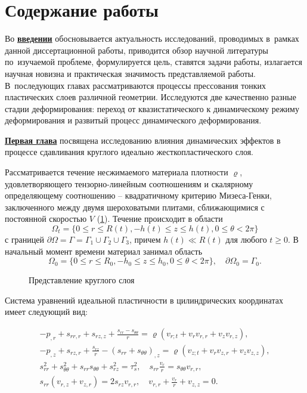 \section*{Содержание работы}
Во \underline{\textbf{введении}} обосновывается актуальность
исследований, проводимых в~рамках данной диссертационной работы,
приводится обзор научной литературы по~изучаемой проблеме,
формулируется цель, ставятся задачи работы, излагается научная новизна
и практическая значимость представляемой работы. В~последующих главах
рассматриваются процессы прессования тонких пластических слоев различной геометрии.
Исследуются две качественно разные стадии деформирования: переход от квазистатического к динамическому режиму деформирования и развитый процесс динамического деформирования.

\underline{\textbf{Первая глава}} посвящена исследованию влияния динамических эффектов в процессе сдавливания круглого идеально жесткопластического слоя.

Рассматривается течение несжимаемого материала плотности $\varrho$, удовлетворяющего тензорно-линейным соотношениям и скалярному определяющему соотношению -- квадратичному критерию Мизеса-Генки, заключенного между двумя шероховатыми плитами, сближающимися с постоянной скоростью $V$ (\cref{fig:ch1/layer}). Течение происходит в области
\begin{equation}
  \Omega_{t} = \{0 \le r \le R(t), -h(t) \le z \le h(t), 0 \le \theta < 2\pi\}
\end{equation}
с границей $\partial\Omega = \Gamma = \Gamma_{1} \cup \Gamma_{2} \cup \Gamma_{3}$, причем $h(t) \ll R(t)$ для любого $t \ge 0$. В начальный момент времени материал занимал область
\begin{equation}
  \Omega_{0} = \{0 \le r \le R_{0}, -h_{0} \le z \le h_{0}, 0 \le \theta < 2\pi\}, \quad \partial\Omega_{0} = \Gamma_{0}.
\end{equation}

\begin{figure}[ht]
  \caption{Представление круглого слоя}
  \label{fig:ch1/layer}
\end{figure}

Система уравнений идеальной пластичности в цилиндрических координатах имеет следующий вид:

\begin{gather}
  \label{eqs:ch1/general/begin}
  -p_{,r}+s_{rr,r}+s_{rz,z}+\frac{s_{rr}-s_{\theta\theta}}{r} = \varrho \left(v_{r;t}+v_{r} v_{r,r} + v_{z} v_{r,z} \right),
  \\
  -p_{,z}+s_{rz,r}+\frac{s_{rz}}{r}-(s_{rr}+s_{\theta\theta})_{,z} = \varrho \left(v_{z;t}+v_{r} v_{z,r} + v_{z} v_{z,z} \right),
  \\
  s^2_{rr}+s^2_{\theta\theta}+s_{rr} s_{\theta\theta} + s^2_{rz}=\tau^2_{s}, \quad s_{rr} \frac{v_{r}}{r} = s_{\theta\theta} v_{r,r},
  \\
  \label{eqs:ch1/general/end}
  s_{rr} (v_{r,z}+v_{z,r}) = 2 s_{rz} v_{r,r}, \quad v_{r,r}+\frac{v_{r}}{r}+v_{z,z} = 0.
\end{gather}

